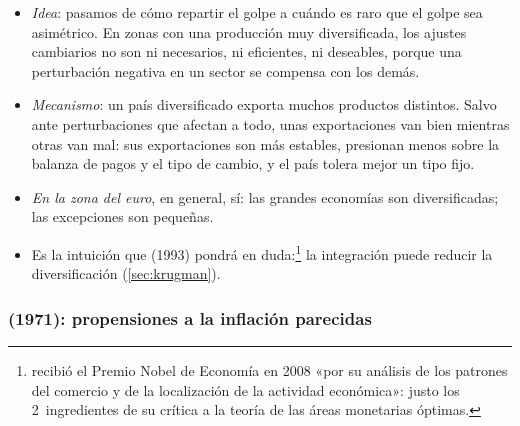 \documentclass[11pt]{article}
\begin{document}
\begin{itemize}
\item \emph{Idea}: pasamos de cómo repartir el golpe a cuándo es raro que el golpe sea asimétrico. En zonas con una producción muy diversificada, los ajustes cambiarios no son ni necesarios, ni eficientes, ni deseables, porque una perturbación negativa en un sector se compensa con los demás\nocite{Kenen1969Theory}.
\item \emph{Mecanismo}: un país diversificado exporta muchos productos distintos. Salvo ante perturbaciones que afectan a todo, unas exportaciones van bien mientras otras van mal: sus exportaciones son más estables, presionan menos sobre la balanza de pagos y el tipo de cambio, y el país tolera mejor un tipo fijo.
\item \emph{En la zona del euro}, en general, sí: las grandes economías son diversificadas; las excepciones son pequeñas.
\item Es la intuición que  (1993) pondrá en duda:\footnote{ recibió el Premio Nobel de Economía en 2008 «por su análisis de los patrones del comercio y de la localización de la actividad económica»\nocite{Nobel2008Krugman}: justo los 2~ingredientes de su crítica a la teoría de las áreas monetarias óptimas.} la integración puede reducir la diversificación (\ref{sec:krugman}).
\end{itemize}

\subsubsection{ (1971): propensiones a la inflación parecidas}\label{sec:magnifico}
\end{document}
